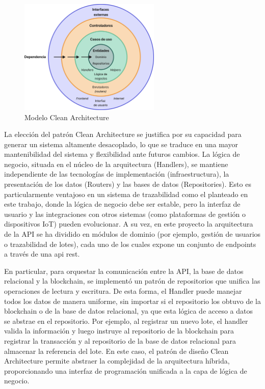 \begin{figure}[!b]
\centering
\includegraphics[width=0.6\textwidth]{Figures/clean-architecture.png}
\caption{Modelo Clean Architecture}
\label{fig:clean-architecture}
\end{figure}

La elección del patrón Clean Architecture se justifica por su capacidad para generar un sistema altamente desacoplado, lo que se traduce en una mayor mantenibilidad del sistema y flexibilidad ante futuros cambios. La lógica de negocio, situada en el núcleo de la arquitectura (Handlers), se mantiene independiente de las tecnologías de implementación (infraestructura), la presentación de los datos (Routers) y las bases de datos (Repositories). Esto es particularmente ventajoso en un sistema de trazabilidad como el planteado en este trabajo, donde la lógica de negocio debe ser estable, pero la interfaz de usuario y las integraciones con otros sistemas (como plataformas de gestión o dispositivos IoT) pueden evolucionar. A su vez, en este proyecto la arquitectura de la API se ha dividido en módulos de dominio (por ejemplo, gestión de usuarios o trazabilidad de lotes), cada uno de los cuales expone un conjunto de endpoints a través de una \acrshort{api} \acrshort{rest}.

En particular, para orquestar la comunicación entre la API, la base de datos relacional y la blockchain, se implementó un patrón de repositorios que unifica las operaciones de lectura y escritura. De esta forma, el Handler puede manejar todos los datos de manera uniforme, sin importar si el repositorio los obtuvo de la blockchain o de la base de datos relacional, ya que esta lógica de acceso a datos se abstrae en el repositorio. Por ejemplo, al registrar un nuevo lote, el handler valida la información y luego instruye al repositorio de la blockchain para registrar la transacción y al repositorio de la base de datos relacional para almacenar la referencia del lote. En este caso, el patrón de diseño Clean Architecture permite abstraer la complejidad de la arquitectura híbrida, proporcionando una interfaz de programación unificada a la capa de lógica de negocio.

